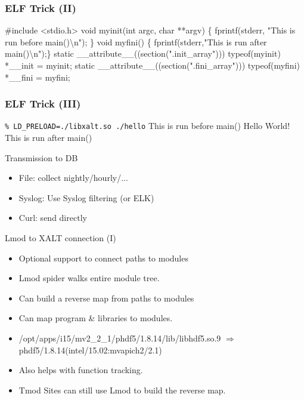 \documentclass{beamer}
\begin{document}
\begin{frame}[fragile]
    \frametitle{ELF Trick (II)}
 {\small
    \begin{semiverbatim}
  #include <stdio.h>
  void myinit(int argc, char **argv)
  \{ fprintf(stderr, "This is run before main()\textbackslash{}n"); \}
  void myfini()
  \{ fprintf(stderr,"This is run after main()\textbackslash{}n");\}
  static \_\_attribute\_\_((section(".init_array")))
       typeof(myinit) *\_\_init = myinit;
  static \_\_attribute\_\_((section(".fini_array")))
       typeof(myfini) *\_\_fini = myfini;
    \end{semiverbatim}
}
\end{frame}

\begin{frame}[fragile]
    \frametitle{ELF Trick (III)}
 {\small
    \begin{semiverbatim}
        \texttt{\% LD\_PRELOAD=./libxalt.so ./hello}
        This is run before main()
        Hello World!
        This is run after main()
    \end{semiverbatim}
}
\end{frame}

\begin{frame}{Transmission to DB}
  \begin{itemize}
    \item File: collect nightly/hourly/...
    \item Syslog: Use Syslog filtering (or ELK)
    \item Curl: send directly 
  \end{itemize}
\end{frame}

\begin{frame}{Lmod to XALT connection (I)}
  \begin{itemize}
    \item Optional support to connect paths to modules
    \item Lmod spider walks entire module tree.
    \item Can build a reverse map from paths to modules
    \item Can map program \& libraries to modules.
    \item /opt/apps/i15/mv2\_2\_1/phdf5/1.8.14/lib/libhdf5.so.9
      $\Rightarrow$ phdf5/1.8.14(intel/15.02:mvapich2/2.1)
    \item Also helps with function tracking.
    \item Tmod Sites can still use Lmod to build the reverse map.
  \end{itemize}
\end{frame}
\end{document}
